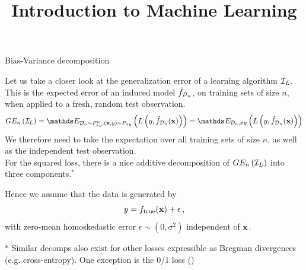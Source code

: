 \documentclass[11pt,compress,t,notes=noshow, xcolor=table]{beamer}
\title{Introduction to Machine Learning}
\begin{document}
    

\begin{vbframe} {Bias-Variance decomposition}

Let us take a closer look at the generalization error of a learning algorithm $\mathcal{I}_{L}$.
This is the expected error of an induced model $\hat{f}_{\mathcal{D}_n}$, on training sets of size $n$, when applied to a fresh, random test observation.
  $$GE_n\left(\ind_{L}\right) = \E_{\D_n \sim \Pxy^n, (\xv, y) \sim \Pxy}\left( L\left(y, \fh_{\D_n}(\xv)\right) \right) = \E_{\D_n, xy}\left( L\left(y, \fh_{\D_n}(\xv)\right) \right)  $$
We therefore need to take the expectation over all training sets of size $n$, as well as the independent test observation.\\

For the squared loss, there is a nice additive decomposition of $GE_n\left(\mathcal{I}_{L}\right)$ into three components.$^{\ast}$

Hence we assume that the data is generated by 
$$
y = f_{\text{true}}(\mathbf{x}) + \epsilon\,,
$$
with zero-mean homoskedastic error $\epsilon \sim (0, \sigma^2)$ independent of $\mathbf{x}$.
\vspace{0.1cm}

{\scriptsize ${\ast}$ Similar decomps also exist for other losses expressible as Bregman divergences (e.g. cross-entropy). One exception is the $0/1$ loss (\cite{BROWN2024BIAS})}

\framebreak 



\end{vbframe}
\end{document}

